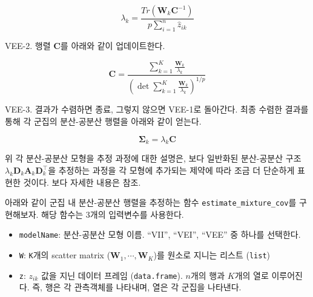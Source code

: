 \documentclass[]{book}
\providecommand{\tightlist}{%
  \setlength{\itemsep}{0pt}\setlength{\parskip}{0pt}}
\begin{document}
\begin{equation*}
\lambda_k = \frac{Tr(\mathbf{W}_k \mathbf{C}^{-1})}{p \sum_{i = 1}^{n} \hat{z}_{ik}}
\end{equation*}

VEE-2. 행렬 \(\mathbf{C}\)를 아래와 같이 업데이트한다.

\begin{equation*}
\mathbf{C} = \frac{\sum_{k = 1}^{K} \frac{\mathbf{W}_k}{\lambda_k}}{\left( \det \sum_{k = 1}^{K} \frac{\mathbf{W}_k}{\lambda_k} \right)^{1 / p}}
\end{equation*}

VEE-3. 결과가 수렴하면 종료, 그렇지 않으면 VEE-1로 돌아간다. 최종 수렴한 결과를 통해 각 군집의 분산-공분산 행렬을 아래와 같이 얻는다.

\begin{equation*}
\boldsymbol\Sigma_k = \lambda_k \mathbf{C}
\end{equation*}

위 각 분산-공분산 모형을 추정 과정에 대한 설명은, 보다 일반화된 분산-공분산 구조 \(\lambda_k \mathbf{D}_k \mathbf{A}_k \mathbf{D}_k^\top\)을 추정하는 과정을 각 모형에 추가되는 제약에 따라 조금 더 단순하게 표현한 것이다. 보다 자세한 내용은 \citet{celeux1995gaussian} 참조.

아래와 같이 군집 내 분산-공분산 행렬을 추정하는 함수 \texttt{estimate\_mixture\_cov}를 구현해보자. 해당 함수는 3개의 입력변수를 사용한다.

\begin{itemize}
\tightlist
\item
  \texttt{modelName}: 분산-공분산 모형 이름. ``VII'', ``VEI'', ``VEE'' 중 하나를 선택한다.
\item
  \texttt{W}: \texttt{K}개의 scatter matrix (\(\mathbf{W}_1, \cdots, \mathbf{W}_K\))를 원소로 지니는 리스트 (\texttt{list})
\item
  \texttt{z}: \(z_{ik}\) 값을 지닌 데이터 프레임 (\texttt{data.frame}). \(n\)개의 행과 \(K\)개의 열로 이루어진다. 즉, 행은 각 관측객체를 나타내며, 열은 각 군집을 나타낸다.
\end{itemize}
\end{document}

